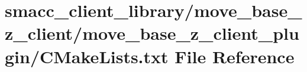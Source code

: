 \hypertarget{smacc__client__library_2move__base__z__client_2move__base__z__client__plugin_2CMakeLists_8txt}{}\section{smacc\+\_\+client\+\_\+library/move\+\_\+base\+\_\+z\+\_\+client/move\+\_\+base\+\_\+z\+\_\+client\+\_\+plugin/\+C\+Make\+Lists.txt File Reference}
\label{smacc__client__library_2move__base__z__client_2move__base__z__client__plugin_2CMakeLists_8txt}
